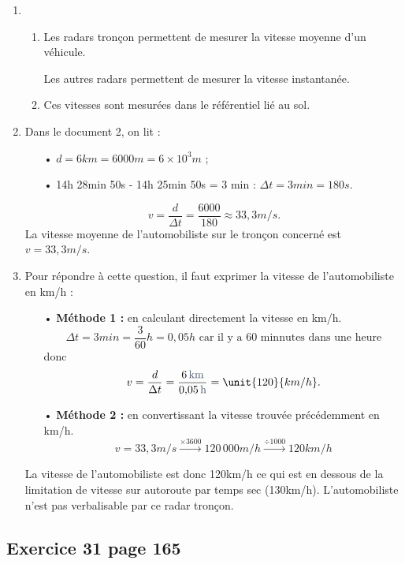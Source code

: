 \documentclass[12pt,a4paper,fleqn]{article}
\begin{document}
\begin{enumerate}
\item
\begin{enumerate}
\item Les radars tronçon permettent de mesurer la vitesse moyenne d'un véhicule.

Les autres radars permettent de mesurer la vitesse instantanée.

\item Ces vitesses sont mesurées dans le référentiel lié au sol.
\end{enumerate}

\item Dans le document 2, on lit :
\begin{itemize}
\item[•] $d=\unit{6}{km} = \unit{6000}{m} = \unit{6\times10^3}{m}$ ;
\item[•] 14h 28min 50s - 14h 25min 50s = 3 min : $\Delta t = \unit{3}{min} = \unit{180}{s}$.
\end{itemize}
\[
v = \frac{d}{\Delta t} = \frac{6000}{180} \approx \unit{33{,}3}{m/s}.
\]
La vitesse moyenne de l'automobiliste sur le tronçon concerné est $v = \unit{33{,}3}{m/s}$.

\item Pour répondre à cette question, il faut exprimer la vitesse de l'automobiliste en km/h :
\begin{itemize}
\item[•] \textbf{Méthode 1 :} en calculant directement la vitesse en km/h.
\[
\Delta t = \unit{3}{min} = \unit{\frac{3}{60}}{h} = \unit{0{,}05}{h} \text{ car il y a 60 minnutes dans une heure}
\]
donc
\[
v = \frac{d}{\Delta t} = \frac{6 \text{\,\color{gray_f}km}}{0{,}05 \text{\,\color{gray_f}h}} = \unit{120}{km/h}.
\]

\item[•] \textbf{Méthode 2 :} en convertissant la vitesse trouvée précédemment en km/h.
\[
v = \unit{33{,}3}{m/s} \xrightarrow{\times 3600} \unit{120\,000}{m/h} \xrightarrow{\div 1000} \unit{120}{km/h}
\]
\end{itemize}
La vitesse de l'automobiliste est donc \unit{120}{km/h} ce qui est en dessous de la limitation de vitesse sur autoroute par temps sec (\unit{130}{km/h}).
L'automobiliste n'est pas verbalisable par ce radar tronçon.
\end{enumerate}

\subsection*{Exercice 31 page 165}
\end{document}
